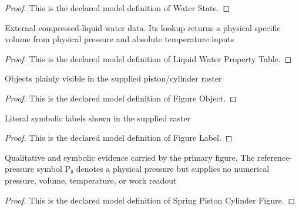 \begin{proof}
  This is the declared model definition of Water State.
\end{proof}
\begin{definition}
  \label{def:physics:phyx-mini-0450:phyxminiproblems-problemphyxmini0450-liquidwaterpropertytable}
  External compressed-liquid water data. Its lookup returns a physical specific volume from physical pressure and absolute temperature inputs
\end{definition}
\begin{proof}
  This is the declared model definition of Liquid Water Property Table.
\end{proof}
\begin{definition}
  \label{def:physics:phyx-mini-0450:phyxminiproblems-problemphyxmini0450-figureobject}
  Objects plainly visible in the supplied piston/cylinder raster
\end{definition}
\begin{proof}
  This is the declared model definition of Figure Object.
\end{proof}
\begin{definition}
  \label{def:physics:phyx-mini-0450:phyxminiproblems-problemphyxmini0450-figurelabel}
  Literal symbolic labels shown in the supplied raster
\end{definition}
\begin{proof}
  This is the declared model definition of Figure Label.
\end{proof}
\begin{definition}
  \label{def:physics:phyx-mini-0450:phyxminiproblems-problemphyxmini0450-springpistoncylinderfigure}
  Qualitative and symbolic evidence carried by the primary figure. The reference-pressure symbol P₀ denotes a physical pressure but supplies no numerical pressure, volume, temperature, or work readout
\end{definition}
\begin{proof}
  This is the declared model definition of Spring Piston Cylinder Figure.
\end{proof}

